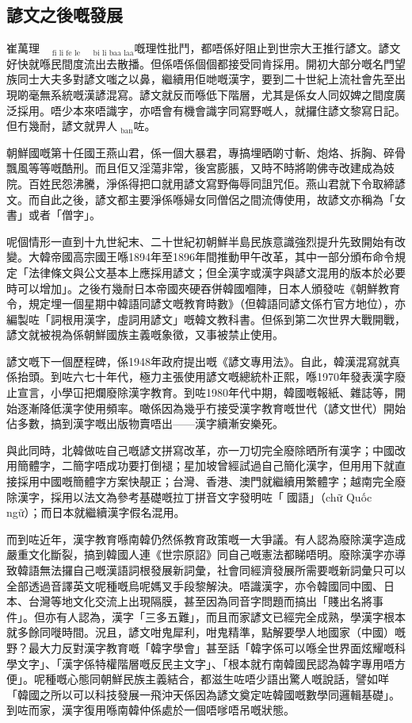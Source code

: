 \subsection*{諺文之後嘅發展}

崔萬理$_{\text{fi li fe le}}$$_{\text{bi li baa laa}}$嘅理性批鬥，都唔係好阻止到世宗大王推行諺文。諺文好快就喺民間度流出去散播。但係唔係個個都接受同肯採用。開初大部分嘅名門望族同士大夫多對諺文嗤之以鼻，繼續用佢哋嘅漢字，要到二十世紀上流社會先至出現啲毫無系統嘅漢諺混寫。諺文就反而喺低下階層，尤其是係女人同奴婢之間度廣泛採用。唔少本來唔識字，亦唔會有機會識字同寫野嘅人，就攞住諺文黎寫日記。
但冇幾耐，諺文就畀人$_{\text{ban}}$咗。

朝鮮國嘅第十任國王燕山君，係一個大暴君，專搞埋晒啲寸斬、炮烙、拆胸、碎骨飄風等等嘅酷刑。而且佢又淫蕩非常，後宮膨脹，又時不時將啲佛寺改建成為妓院。百姓民怨沸騰，淨係得把口就用諺文寫野侮辱同詛咒佢。燕山君就下令取締諺文。而自此之後，諺文都主要淨係喺婦女同僧侶之間流傳使用，故諺文亦稱為「女書」或者「僧字」。

呢個情形一直到十九世紀末、二十世紀初朝鮮半島民族意識強烈提升先致開始有改變。大韓帝國高宗國王喺1894年至1896年間推動甲午改革，其中一部分頒布命令規定「法律條文與公文基本上應採用諺文；但全漢字或漢字與諺文混用的版本於必要時可以增加」。之後冇幾耐日本帝國夾硬吞併韓國嗰陣，日本人頒發咗《朝鮮教育令，規定埋一個星期中韓語同諺文嘅教育時數》（但韓語同諺文係冇官方地位），亦編製咗「詞根用漢字，虛詞用諺文」嘅韓文教科書。但係到第二次世界大戰開戰，諺文就被視為係朝鮮國族主義嘅象徵，又事被禁止使用。

諺文嘅下一個歷程碑，係1948年政府提出嘅《諺文專用法》。自此，韓漢混寫就真係抬頭。到咗六七十年代，極力主張使用諺文嘅總統朴正熙，喺1970年發表漢字廢止宣言，小學冚把爛廢除漢字教育。到咗1980年代中期，韓國嘅報紙、雜誌等，開始逐漸降低漢字使用頻率。噉係因為幾乎冇接受漢字教育嘅世代（諺文世代）開始佔多數，搞到漢字嘅出版物賣唔出——漢字續漸安樂死。

與此同時，北韓做咗自己嘅諺文拼寫改革，亦一刀切完全廢除晒所有漢字；中國改用簡體字，二簡字唔成功要打倒褪；星加坡曾經試過自己簡化漢字，但用用下就直接採用中國嘅簡體字方案快靚正；台灣、香港、澳門就繼續用繁體字；越南完全廢除漢字，採用以法文為參考基礎嘅拉丁拼音文字發明咗「𡨸國語」（chữ
Quốc ngữ）；而日本就繼續漢字假名混用。

而到咗近年，漢字教育喺南韓仍然係教育政策嘅一大爭議。有人認為廢除漢字造成嚴重文化斷裂，搞到韓國人連《世宗原詔》同自己嘅憲法都睇唔明。廢除漢字亦導致韓語無法攞自己嘅漢語詞根發展新詞彙，社會同經濟發展所需要嘅新詞彙只可以全部透過音譯英文呢種嘅烏呢媽叉手段黎解決。唔識漢字，亦令韓國同中國、日本、台灣等地文化交流上出現隔膜，甚至因為同音字問題而搞出「賤出名將事件」。但亦有人認為，漢字「三多五難」，而且而家諺文已經完全成熟，學漢字根本就多餘同嘥時間。況且，諺文咁鬼犀利，咁鬼精準，點解要學人地國家（中國）嘅野？最大力反對漢字教育嘅「韓字學會」甚至話「韓字係可以喺全世界面炫耀嘅科學文字」、「漢字係特權階層嘅反民主文字」、「根本就冇南韓國民認為韓字專用唔方便」。呢種嘅心態同朝鮮民族主義結合，都滋生咗唔少語出驚人嘅說話，譬如咩「韓國之所以可以科技發展一飛沖天係因為諺文奠定咗韓國嘅數學同邏輯基礎」。到咗而家，漢字復用喺南韓仲係處於一個唔嗲唔吊嘅狀態。


